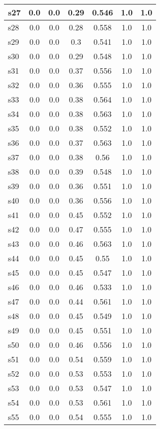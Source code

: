 \documentclass{article}
\begin{document}
\begin{tabular}{|l|c|c|c|c|c|c|}
s27 &0.0 & 0.0 & 0.29 & 0.546 & 1.0 & 1.0\\
\hline
s28 &0.0 & 0.0 & 0.28 & 0.558 & 1.0 & 1.0\\
\hline
s29 &0.0 & 0.0 & 0.3 & 0.541 & 1.0 & 1.0\\
\hline
s30 &0.0 & 0.0 & 0.29 & 0.548 & 1.0 & 1.0\\
\hline
s31 &0.0 & 0.0 & 0.37 & 0.556 & 1.0 & 1.0\\
\hline
s32 &0.0 & 0.0 & 0.36 & 0.555 & 1.0 & 1.0\\
\hline
s33 &0.0 & 0.0 & 0.38 & 0.564 & 1.0 & 1.0\\
\hline
s34 &0.0 & 0.0 & 0.38 & 0.563 & 1.0 & 1.0\\
\hline
s35 &0.0 & 0.0 & 0.38 & 0.552 & 1.0 & 1.0\\
\hline
s36 &0.0 & 0.0 & 0.37 & 0.563 & 1.0 & 1.0\\
\hline
s37 &0.0 & 0.0 & 0.38 & 0.56 & 1.0 & 1.0\\
\hline
s38 &0.0 & 0.0 & 0.39 & 0.548 & 1.0 & 1.0\\
\hline
s39 &0.0 & 0.0 & 0.36 & 0.551 & 1.0 & 1.0\\
\hline
s40 &0.0 & 0.0 & 0.36 & 0.556 & 1.0 & 1.0\\
\hline
s41 &0.0 & 0.0 & 0.45 & 0.552 & 1.0 & 1.0\\
\hline
s42 &0.0 & 0.0 & 0.47 & 0.555 & 1.0 & 1.0\\
\hline
s43 &0.0 & 0.0 & 0.46 & 0.563 & 1.0 & 1.0\\
\hline
s44 &0.0 & 0.0 & 0.45 & 0.55 & 1.0 & 1.0\\
\hline
s45 &0.0 & 0.0 & 0.45 & 0.547 & 1.0 & 1.0\\
\hline
s46 &0.0 & 0.0 & 0.46 & 0.533 & 1.0 & 1.0\\
\hline
s47 &0.0 & 0.0 & 0.44 & 0.561 & 1.0 & 1.0\\
\hline
s48 &0.0 & 0.0 & 0.45 & 0.549 & 1.0 & 1.0\\
\hline
s49 &0.0 & 0.0 & 0.45 & 0.551 & 1.0 & 1.0\\
\hline
s50 &0.0 & 0.0 & 0.46 & 0.556 & 1.0 & 1.0\\
\hline
s51 &0.0 & 0.0 & 0.54 & 0.559 & 1.0 & 1.0\\
\hline
s52 &0.0 & 0.0 & 0.53 & 0.553 & 1.0 & 1.0\\
\hline
s53 &0.0 & 0.0 & 0.53 & 0.547 & 1.0 & 1.0\\
\hline
s54 &0.0 & 0.0 & 0.53 & 0.561 & 1.0 & 1.0\\
\hline
s55 &0.0 & 0.0 & 0.54 & 0.555 & 1.0 & 1.0\\

\end{tabular}
\end{document}
